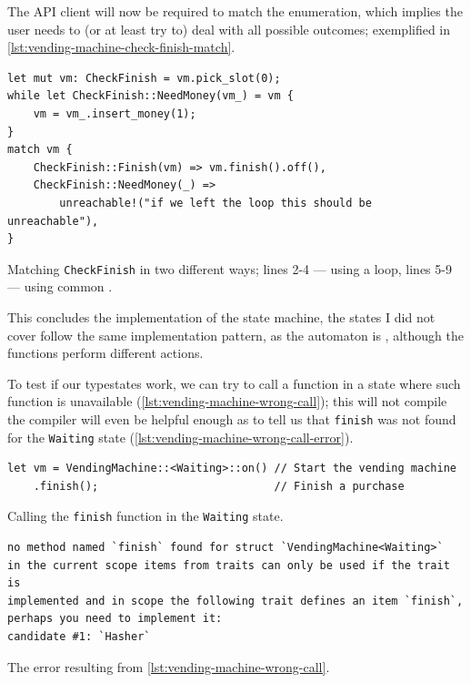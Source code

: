 The \gls{API} client will now be required to match the enumeration,
which implies the user needs to (or at least try to) deal with all possible outcomes;
exemplified in \autoref{lst:vending-machine-check-finish-match}.

\begin{listing}
    \begin{verbatim}
let mut vm: CheckFinish = vm.pick_slot(0);
while let CheckFinish::NeedMoney(vm_) = vm {
    vm = vm_.insert_money(1);
}
match vm {
    CheckFinish::Finish(vm) => vm.finish().off(),
    CheckFinish::NeedMoney(_) =>
        unreachable!("if we left the loop this should be unreachable"),
}
\end{verbatim}
    \caption{
        Matching \texttt{CheckFinish} in two different ways;
        lines 2-4 --- using a  loop,
        lines 5-9 --- using common .
    }
    \label{lst:vending-machine-check-finish-match}
\end{listing}

This concludes the implementation of the state machine,
the states I did not cover follow the same implementation pattern,
as the automaton is , although the functions perform different actions.

To test if our typestates work, we can try to call a function in a state where such function is unavailable (\autoref{lst:vending-machine-wrong-call});
this will not compile the compiler will even be helpful enough as to tell us that
\texttt{finish} was not found for the \texttt{Waiting} state (\autoref{lst:vending-machine-wrong-call-error}).

\begin{listing}
    \begin{verbatim}
let vm = VendingMachine::<Waiting>::on() // Start the vending machine
    .finish();                           // Finish a purchase
\end{verbatim}
    \caption{Calling the \texttt{finish} function in the \texttt{Waiting} state.}
    \label{lst:vending-machine-wrong-call}
\end{listing}

\begin{listing}
    \begin{verbatim}
no method named `finish` found for struct `VendingMachine<Waiting>`
in the current scope items from traits can only be used if the trait is
implemented and in scope the following trait defines an item `finish`,
perhaps you need to implement it:
candidate #1: `Hasher`
\end{verbatim}
    \caption{The error resulting from \autoref{lst:vending-machine-wrong-call}.}
    \label{lst:vending-machine-wrong-call-error}
\end{listing}

